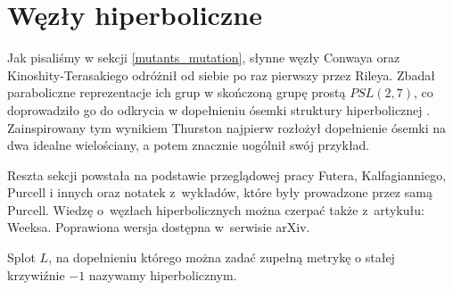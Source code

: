 \section{Węzły hiperboliczne} %
\label{sec:hyperbolic}
Jak pisaliśmy w sekcji \ref{mutants_mutation}, słynne węzły Conwaya oraz Kinoshity-Terasakiego odróżnił od siebie po raz pierwszy przez Rileya.
Zbadał paraboliczne reprezentacje ich grup w skończoną grupę prostą $PSL(2, 7)$, co doprowadziło go do odkrycia w dopełnieniu ósemki struktury hiperbolicznej \cite{riley75}.
Zainspirowany tym wynikiem Thurston najpierw rozłożył dopełnienie ósemki na dwa idealne wielościany, a potem znacznie uogólnił swój przykład.

Reszta sekcji powstała na podstawie przeglądowej pracy \cite{purcell19} Futera, Kalfagianniego, Purcell i innych oraz notatek z~wykładów, które były prowadzone przez samą Purcell.
Wiedzę o~węzłach hiperbolicznych można czerpać także z~artykułu: \cite{weeks05} Weeksa.
Poprawiona wersja dostępna w~serwisie arXiv.








\begin{definition}[hiperboliczny]
    Splot $L$, na dopełnieniu którego można zadać zupełną metrykę o stałej krzywiźnie $-1$ nazywamy hiperbolicznym.
\end{definition}

